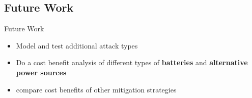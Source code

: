\documentclass{beamer}
\begin{document}
\subsection{Future Work}
\begin{frame}{Future Work}
\begin{itemize}

	\item Model and test additional attack types 
	\item Do a cost benefit analysis of different types of \textbf{batteries} and \textbf{alternative power sources}
	\item compare cost benefits of other mitigation strategies 

\end{itemize}
\end{frame}	
\end{document}
